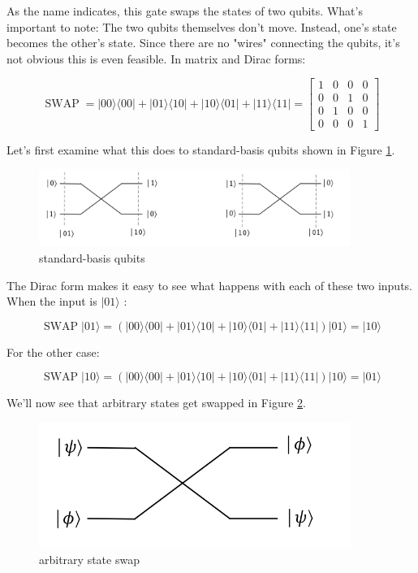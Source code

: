 \documentclass[main.tex]{subfiles}
\begin{document}
    As the name indicates, this gate swaps the states of two qubits. What's important to note: The two qubits themselves don't move. Instead, one's state becomes the other's state. Since there are no "wires" connecting the qubits, it's not obvious this is even feasible. In matrix and Dirac forms:
    
    $$
    \operatorname{SWAP}=|00\rangle\langle 00|+| 01\rangle\langle 10|+| 10\rangle\langle 01|+| 11\rangle\langle 11|=\left[\begin{array}{cccc}
    1 & 0 & 0 & 0 \\
    0 & 0 & 1 & 0 \\
    0 & 1 & 0 & 0 \\
    0 & 0 & 0 & 1
    \end{array}\right]
    $$
    
    Let's first examine what this does to standard-basis qubits shown in Figure \ref{fig:24swap2}.
    
    \begin{figure}
        \centering
        \includegraphics[width=4in]{notes/figs/n08/24swap2.png}
        \caption{standard-basis qubits}
        \label{fig:24swap2}
    \end{figure}

    The Dirac form makes it easy to see what happens with each of these two inputs. When the input is $|01\rangle$ :
    
    $$
    \operatorname{SWAP}|01\rangle=(|00\rangle\langle 00|+| 01\rangle\langle 10|+| 10\rangle\langle 01|+| 11\rangle\langle 11|)|01\rangle=|10\rangle
    $$
    
    For the other case:
    
    $$
    \operatorname{SWAP}|10\rangle=(|00\rangle\langle 00|+| 01\rangle\langle 10|+| 10\rangle\langle 01|+| 11\rangle\langle 11|)|10\rangle=|01\rangle
    $$
    
    We'll now see that arbitrary states get swapped in Figure \ref{fig:25swap3}.
    
    \begin{figure}
        \centering
        \includegraphics[width=4in]{notes/figs/n08/25swap3.png}
        \caption{arbitrary state swap}
        \label{fig:25swap3}
    \end{figure}
    
\end{document}

